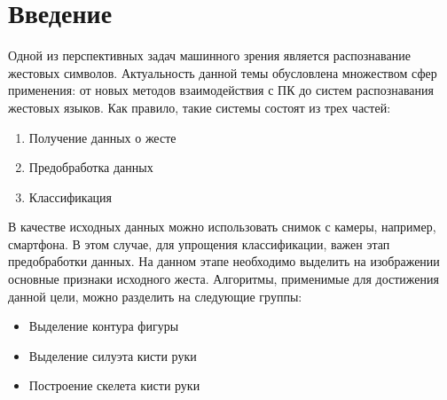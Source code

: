 \section{Введение}
\label{sec:Intro}

Одной из перспективных задач машинного зрения является распознавание жестовых символов. Актуальность данной темы обусловлена множеством сфер применения: от новых методов взаимодействия с ПК до систем распознавания жестовых языков. 
Как правило, такие системы состоят из трех частей:

\begin{enumerate}
	\item Получение данных о жесте
	\item Предобработка данных
	\item Классификация
\end{enumerate}

В качестве исходных данных можно использовать снимок с камеры, например, смартфона. В этом случае, для упрощения классификации, важен этап предобработки данных. На данном этапе необходимо выделить на изображении основные признаки исходного жеста. Алгоритмы, применимые для достижения данной цели, можно разделить на следующие группы:
\begin{itemize}
	\item Выделение контура фигуры
	\item Выделение силуэта кисти руки
	\item Построение скелета кисти руки
\end{itemize}

